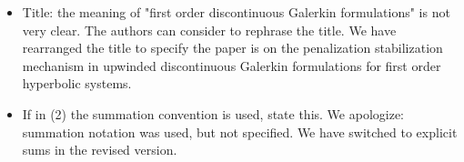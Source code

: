 \documentclass[10pt]{article}
\newcommand{\note}[1]{{\color{blue}#1}}
\begin{document}
\begin{itemize}
\item Title: the meaning of "first order discontinuous Galerkin formulations" is not very clear. The authors can consider to rephrase the title.
\note{We have rearranged the title to specify the paper is on the penalization stabilization mechanism in upwinded discontinuous Galerkin formulations for first order hyperbolic systems.}
\item If in (2) the summation convention is used, state this.
\note{We apologize: summation notation was used, but not specified.  We have switched to explicit sums in the revised version.}
\end{itemize}



\end{document}
